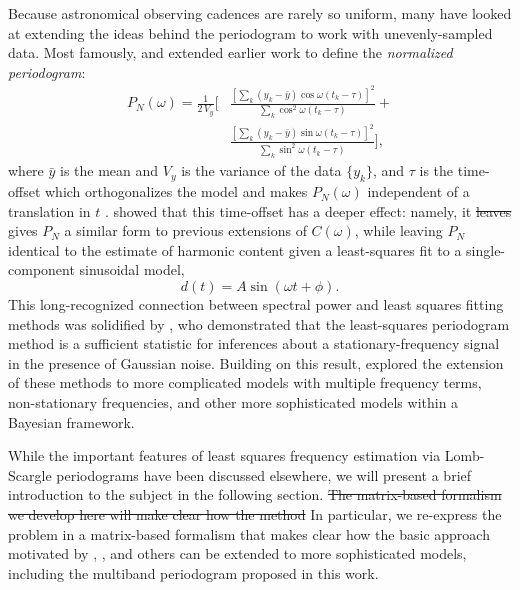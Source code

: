 \documentclass{emulateapj}
\newcommand{\eqlabel}[1]{\label{eq:#1}}
\newcommand{\new}[1]{{\color{red} #1}}
\newcommand{\old}[1]{{\sout{#1}}}
\begin{document}
Because astronomical observing cadences are rarely so uniform, many have looked at extending the ideas behind the periodogram to work with unevenly-sampled data. Most famously, \citet{Lomb76} and \citet{Scargle82} extended earlier work to define the {\it normalized periodogram}:
\begin{eqnarray}
  \eqlabel{LombScargle}
  P_N(\omega) = \frac{1}{2\,V_y}
  \Bigg[&\frac{\left[\sum_k(y_k - \bar{y})\cos\omega(t_k - \tau)\right]^2}
    {\sum_k \cos^2\omega(t_k - \tau)} +\nonumber\\
   & \frac{\left[\sum_k(y_k - \bar{y})\sin\omega(t_k - \tau)\right]^2}
    {\sum_k \sin^2\omega(t_k - \tau)}\Bigg],
\end{eqnarray}
where $\bar{y}$ is the mean and $V_y$ is the variance of the data $\{y_k\}$, and $\tau$ is the time-offset which \new{orthogonalizes the model and} makes $P_N(\omega)$ independent of a translation in $t$ \citep[see][for an in-depth discussion]{NumRec}. \citet{Lomb76} showed that this time-offset has a deeper effect: namely, it \old{leaves} \new{gives $P_N$ a similar form to previous extensions of $C(\omega)$, while leaving} $P_N$ identical to the estimate of harmonic content given a least-squares fit to a single-component sinusoidal model,
\begin{equation}
  \eqlabel{SingleModel}
  d(t) = A\sin(\omega t + \phi).
\end{equation}
This long-recognized connection between spectral power and least squares fitting methods was solidified by \citet{Jaynes87}, who demonstrated that the least-squares periodogram method is a sufficient statistic for inferences about a stationary-frequency signal in the presence of Gaussian noise. Building on this result, \citet{Bretthorst88} explored the extension of these methods to more complicated models with multiple frequency terms, non-stationary frequencies, and other more sophisticated models within a Bayesian framework.

While the important features of least squares frequency estimation via Lomb-Scargle periodograms have been discussed elsewhere, we will present a brief introduction to the subject in the following section.
\old{The matrix-based formalism we develop here will make clear how the method} \new{In particular, we re-express the problem in a matrix-based formalism that makes clear how the basic approach motivated by \citet{Lomb76}, \citet{Scargle82}, and others} can be extended to more sophisticated models, including the multiband periodogram proposed in this work.
\end{document}
